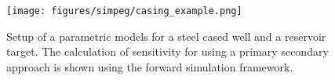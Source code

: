 \begin{figure}[!htbp]
\begin{center}
\texttt{[image: figures/simpeg/casing\_example.png]}
\end{center}
\caption{
Setup of a parametric models for a steel cased well and a reservoir target. The calculation of sensitivity for using a primary secondary approach is shown using the forward simulation framework.
}
\label{fig:simpeg-casing_example}
\end{figure}
